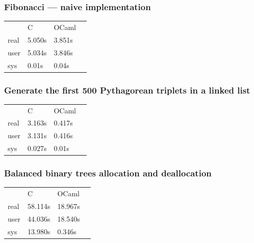 \documentclass[aspectratio=169]{beamer}
\begin{document}
\begin{frame}
  \frametitle{Fibonacci --- naive implementation}
  \begin{table}
    \centering
    \begin{tabular}{llll}\label{tab:fibtab}
           & C      & OCaml  & \\
      real & 5.050s & 3.851s & \\
      user & 5.034s & 3.846s & \\
      sys  & 0.01s  & 0.04s  &
    \end{tabular}
  \end{table}
\end{frame}

\begin{frame}
  \frametitle{Generate the first 500 Pythagorean triplets in a linked list}
  \begin{table}
    \centering
    \begin{tabular}{llll}\label{tab:pythagtab}
           & C      & OCaml  & \\
      real & 3.163s & 0.417s & \\
      user & 3.131s & 0.416s & \\
      sys  & 0.027s & 0.01s  &
    \end{tabular}
  \end{table}
\end{frame}

\begin{frame}
  \frametitle{Balanced binary trees allocation and deallocation}
  \centering
  \begin{tabular}{llll}\label{tab:bintreetab}
         & C       & OCaml   & \\
    real & 58.114s & 18.967s & \\
    user & 44.036s & 18.540s & \\
    sys  & 13.980s & 0.346s  &
  \end{tabular}
\end{frame}

\end{document}
